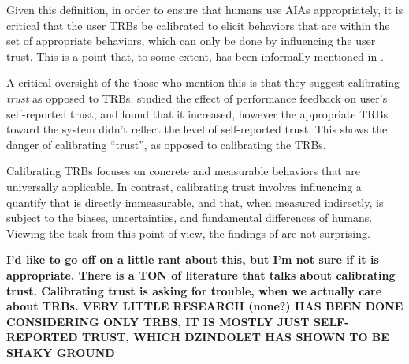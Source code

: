     Given this definition, in order to ensure that humans use AIAs appropriately, it is critical that the user TRBs be calibrated to elicit behaviors that are within the set of appropriate behaviors, which can only be done by influencing the user trust. This is a point that, to some extent, has been informally mentioned in \citet{Muir1994-ow,Muir1987-mk,Lillard2016-yg,Lee2004-pv,Hutchins2015-if}.

    A critical oversight of the those who mention this is that they suggest calibrating \emph{trust} as opposed to TRBs. \citet{Dzindolet2003-ts} studied the effect of performance feedback on user's self-reported trust, and found that it increased, however the appropriate TRBs toward the system didn't reflect the level of self-reported trust. This shows the danger of calibrating ``trust'', as opposed to calibrating the TRBs.

    Calibrating TRBs focuses on concrete and measurable behaviors that are universally applicable. In contrast, calibrating trust involves influencing a quantify that is directly immeasurable, and that, when measured indirectly, is subject to the biases, uncertainties, and fundamental differences of humans. Viewing the task from this point of view, the findings of \citeauthor{Dzindolet2003-ts} are not surprising.

    \textbf{I'd like to go off on a little rant about this, but I'm not sure if it is appropriate. There is a TON of literature that talks about calibrating trust. Calibrating trust is asking for trouble, when we actually care about TRBs. VERY LITTLE RESEARCH  (none?) HAS BEEN DONE CONSIDERING ONLY TRBS, IT IS MOSTLY JUST SELF-REPORTED TRUST, WHICH DZINDOLET HAS SHOWN TO BE SHAKY GROUND} 

